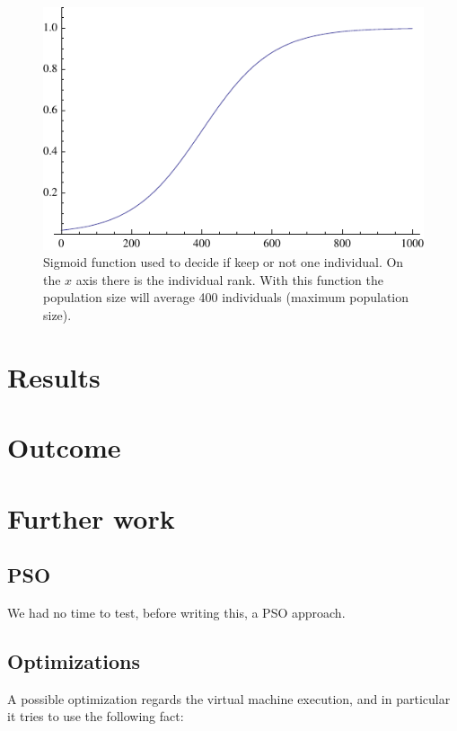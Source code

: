 \documentclass{report}
\begin{document}
\begin{figure}[h]\centering
\includegraphics{figures/decision-function.pdf}
\caption{Sigmoid function used to decide if keep or not one individual. On the $x$ axis there is the individual rank. With this function the population size will average 400 individuals (maximum population size).}
\end{figure}




\chapter{Results}
\label{chap:results}


\chapter{Outcome}
\label{chap:outcome}


\chapter{Further work}
\label{chap:fwork}

\section{PSO}
We had no time to test, before writing this, a PSO approach.

\section{Optimizations}
A possible optimization regards the virtual machine execution, and in particular it tries to use the following fact:
\end{document}
